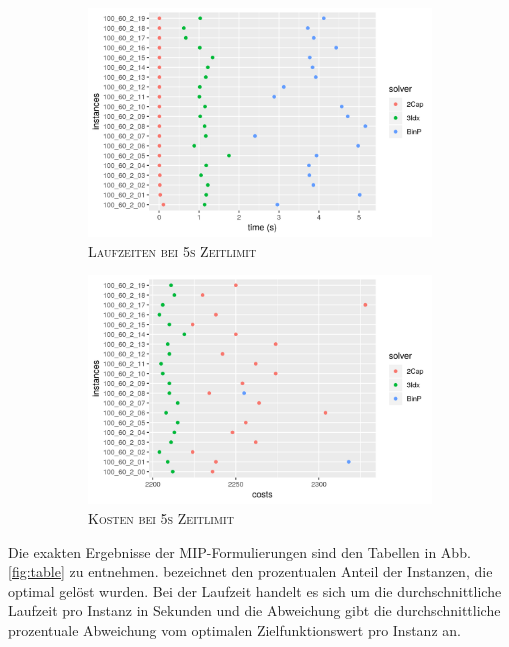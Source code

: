 \begin{figure}[H]
\centering
\begin{subfigure}[b]{0.4\textwidth}
\centering
\includegraphics[width=1.3\textwidth]{img/solver_instance_time_b=2_s_5s.png}
\caption{\textsc{Laufzeiten bei 5s Zeitlimit}}
\label{fig:b=2_s_runtimes}
\end{subfigure}
\hfill
\begin{subfigure}[b]{0.4\textwidth}
\centering
\includegraphics[width=1.3\textwidth]{img/solver_instance_cost_b=2_s_5s.png}
\caption{\textsc{Kosten bei 5s Zeitlimit}}
\label{fig:b=2_s_costs}
\end{subfigure}
\caption{}
\end{figure}

Die exakten Ergebnisse der MIP-Formulierungen sind den Tabellen in Abb. \ref{fig:table} zu entnehmen.
 bezeichnet den prozentualen Anteil der Instanzen, die optimal gelöst wurden. Bei der Laufzeit handelt
es sich um die durchschnittliche Laufzeit pro Instanz in Sekunden und die Abweichung gibt die durchschnittliche prozentuale Abweichung
vom optimalen Zielfunktionswert pro Instanz an.

